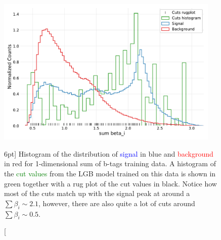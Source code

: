 \documentclass[a4paper, twoside, nobib]{tufte-book}
\begin{document}
\begin{figure}
  \includegraphics[width=0.95\textwidth, trim=10 10 10 20, clip]{figures/quarks/gtag_sum_method_njet=4-down_sample=1.00-ML_vars=vertex-selection=b-ejet_min=4-n_iter_RS_lgb=99-n_iter_RS_xgb=9-cdot_cut=0.90-version=19.pdf}
  \caption[1D Sum Model Cuts for 4-jets][6pt]
          {Histogram of the distribution of \textcolor{blue}{signal} in blue and \textcolor{red}{background} in red for 1-dimensional sum of b-tags training data. A histogram of the \textcolor{green}{cut values} from the LGB model trained on this data is shown in green together with a rug plot of the cut values in black. Notice how most of the cuts match up with the signal peak at around a $\sum \beta_i \sim 2.1$, however, there are also quite a lot of cuts around $\sum \beta_i \sim 0.5$.
          } 
  \label{fig:q:1d_sum_model_cuts_4j}
\end{figure}
\end{document}
